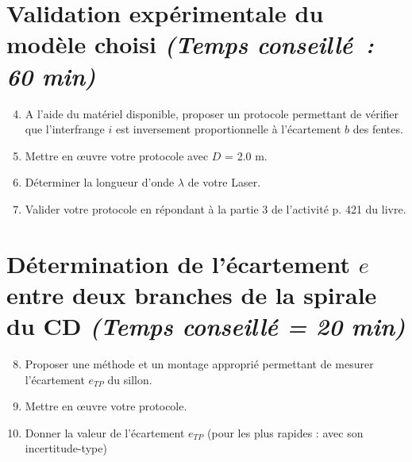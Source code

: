 \documentclass[a4paper,11pt,fleqn]{article}%
\begin{document}
\noindent
{}

\section{Validation expérimentale du modèle choisi \emph{(Temps conseillé : 60 min)}}

\begin{enumerate}
\setcounter{enumi}{3}
    \item A l’aide du matériel disponible, proposer un protocole permettant de vérifier que l’interfrange $i$ est inversement proportionnelle à l’écartement $b$ des fentes.
\end{enumerate}

\begin{enumerate}
\setcounter{enumi}{4}
    \item Mettre en \oe uvre votre protocole avec $D$ = \num{2,0} \unit{\meter}.
    \item Déterminer la longueur d’onde $\lambda$ de votre Laser.
    \item Valider votre protocole en répondant à la partie 3 de l'activité p. 421 du livre.
\end{enumerate}


\section{Détermination de l’écartement $e$ entre deux branches de la spirale du CD \emph{(Temps conseillé = 20 min)}}
\begin{enumerate}
\setcounter{enumi}{7}
    \item Proposer une méthode et un montage approprié permettant de mesurer l’écartement $e_{TP}$ du sillon.
\end{enumerate}

\noindent
{}

\begin{enumerate}
\setcounter{enumi}{8}
    \item Mettre en \oe uvre votre protocole.
    \item Donner la valeur de l'écartement $e_{TP}$ (pour les plus rapides : avec son incertitude-type)
\end{enumerate}
\end{document}
